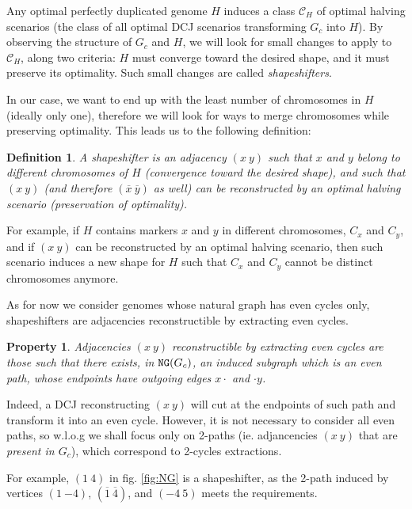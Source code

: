 \documentclass[11pt,final,twoside,nofrench]{thlifl}
\newcommand{\fst}[1]{ \ensuremath{#1} }
\newcommand{\snd}[1]{ \ensuremath{\overline{#1}} }
\newcommand{\mfst}[1]{ \ensuremath{{- #1}} }
\newcommand\aff[2]{\ensuremath{(\fst{#1}~\fst{#2})}}
\newcommand\ass[2]{\ensuremath{(\snd{#1}~\snd{#2})}}
\renewcommand{\NG}{\ensuremath{\mbox{\texttt{NG}}}}
\newtheorem{property}{Property}
\newtheorem{definition}{Definition}
\begin{document}
Any optimal perfectly duplicated genome $H$ induces a class
$\mathcal{C}_H$ of optimal halving scenarios (the class of all optimal
DCJ scenarios transforming $G_c$ into $H$). By observing the structure
of $G_c$ and $H$, we will look for small changes to apply to
$\mathcal{C}_H$, along two criteria: $H$ must converge toward the
desired shape, and it must preserve its optimality.  Such small
changes are called \emph{shapeshifters}.

In our case, we want to end up with the least number of chromosomes in
$H$ (ideally only one), therefore we will look for ways to merge
chromosomes while preserving optimality. This leads us to the
following definition:

\begin{definition}
A shapeshifter is an adjacency \aff{x}{y} such that $x$ and $y$ belong to \emph{different chromosomes} of $H$ (convergence toward the desired shape), and such that \aff{x}{y} (and therefore \ass{x}{y} as well) can be reconstructed by an optimal halving scenario (preservation of optimality).
\end{definition}

For example, if $H$ contains markers $x$ and $y$ in different
chromosomes, $C_x$ and $C_y$, and if \aff{x}{y} can be reconstructed
by an optimal halving scenario, then such scenario induces a new shape
for $H$ such that $C_x$ and $C_y$ cannot be distinct chromosomes
anymore.

As for now we consider genomes whose natural graph has even cycles only, shapeshifters are adjacencies reconstructible by extracting even cycles.

\begin{property}
Adjacencies \aff{x}{y} reconstructible by extracting even cycles are those such that there exists, in $\NG(G_c)$, an induced subgraph which is an \emph{even} path, whose endpoints have outgoing edges $x\cdot$ and $\cdot y$.
\end{property}

Indeed, a DCJ reconstructing \aff{x}{y} will cut at the endpoints of such path and transform it into an even cycle.
However, it is not necessary to consider all even paths, so w.l.o.g we shall focus only on 2-paths (ie. adjancencies \aff{x}{y} that are \emph{present in $G_c$}), which correspond to 2-cycles extractions.

For example, $\aff{1}{4}$ in fig. \ref{fig:NG} is a shapeshifter, as the 2-path induced by vertices $(\fst{1}~\mfst{4})$, $\ass{1}{4}$, and $\aff{-4}{5}$ meets the requirements.
\end{document}
